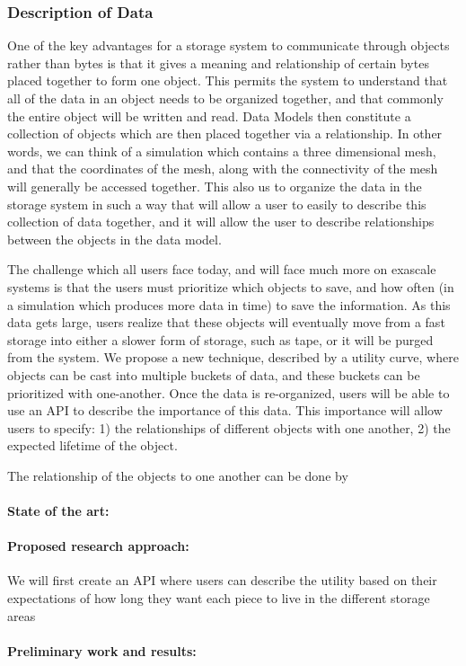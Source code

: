 \subsubsection{Description of Data}

One of the key advantages for a storage system to communicate through objects rather than 
bytes is that it gives a meaning and relationship of certain bytes placed together to form one object.
This permits the system to understand that all of the data in an object needs to be organized together,
and that commonly the entire object will be written and read. Data Models then constitute a collection
of objects which are then placed together via a relationship. In other words, we can think of a
simulation which contains a three dimensional mesh, and that the coordinates of the mesh, along
with the connectivity of the mesh will generally be accessed together. This also us to organize
the data in the storage system in such a way that will allow a user to easily to describe this 
collection of data together, and it will allow the user to describe relationships between the objects
in the data model. 

The challenge which all users face today, and will face much more on exascale systems is that 
the users must prioritize which objects to save, and how often (in a simulation which produces more
data in time)  to save the information. As this data gets large,  users realize that these objects will
eventually move from a fast storage into either a slower form of storage, such as tape, or it will be
purged from the system.  We propose a new technique, described by a utility curve, where objects
can be cast into multiple buckets of data, and these buckets can be prioritized with one-another.
Once the data is re-organized, users will be able to use an API to describe the importance of this data.
This importance will allow users to specify: 1) the relationships of different objects with one another,
2) the expected lifetime of the object.

The relationship of the objects to one another can be done by

\paragraph{State of the art:} 
\paragraph{Proposed research approach:} 
We will first create an API where users can describe the utility based on their expectations of how
long they want each piece to live in the different storage areas
\paragraph{Preliminary work and results:}